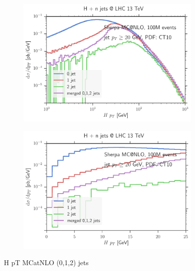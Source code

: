 \begin{figure}
\centering
\begin{subfigure}[]{0.49\textwidth}
	\includegraphics[width=\textwidth]{images/cmp100m_mcatnlo_hpt.pdf}
\end{subfigure}
\hfill
\begin{subfigure}[]{0.49\textwidth}
	\includegraphics[width=\textwidth]{images/cmp100m_mcatnlo_hptpeak.pdf}
\end{subfigure}
\caption{H pT MCatNLO (0,1,2) jets}
\end{figure}
%
